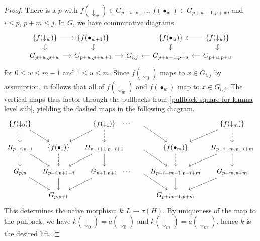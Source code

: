 \documentclass{amsart}
\numberwithin{theorem}{subsection}
\theoremstyle{definition}
\begin{document}
\begin{proof}
There is a $p$ with $f(\downarrow_w) \in G_{p+w, p+w}$, $f(\bullet_w) \in G_{p+w-1, p+w}$, 
and $i\leq p$, $p+m \leq j$.
In $G$, we have commutative diagrams
\[ \begin{tikzcd}[sep=small]
\{ f(\downarrow_w) \}  \rar \dar[hook] & \{ f(\bullet_{w+1}) \} \dar[hook] & & \{f(\bullet_u)\} \dar[hook] & \{f(\downarrow_u)\} \dar[hook] \lar \\
G_{p+w, p+w} \rar & G_{p+w,p+w+1} \rar & G_{i,j} & G_{p+u-1,p+u} \lar & G_{p+u,p+u} \lar
\end{tikzcd} \]
for $0\leq w \leq m-1$ and $1\leq u \leq m$. 
Since $f(\downarrow_0)$ maps to $x\in G_{i,j}$ by assumption, it follows that all of $f(\downarrow_w)$ and $f(\bullet_w)$ map to $x\in G_{i,j}$.
The vertical maps thus factor through the pullbacks from \eqref{pullback square for lemma level sub}, yielding the dashed maps in the following diagram.
\[
\begin{tikzcd}[column sep=tiny]
\{f(\downarrow_0)\} \arrow[dr] \dar[dashed] & & \{f(\downarrow_1)\} \arrow[dl]\dar[dashed] 
&[-1.6em] \cdots & {} \arrow[dr] & & \{f(\downarrow_m)\} \arrow[dl]\dar[dashed] 
 \\
H_{p-i,p-i} \arrow[dr]  \dar &  \{ f(\bullet_1) \}\dar[dashed]  & H_{p-i+1,p-i+1} \arrow[dl] \dar 
 & & {} \arrow[dr] & \{f(\bullet_m)\} \dar[dashed] & H_{p-i+m,p-i+m} \dar \arrow[dl] 
 \\
G_{p,p} \arrow[dr] & H_{p-i,p+1-i} \dar & G_{p+1,p+1} \arrow[dl]
&  \cdots & {}  \arrow[dr] & H_{p-i+m-1,p-i+m} \dar & G_{p+m,p+m} \arrow[dl]
 \\
& G_{p,p+1} & &  & & G_{p+m-1,p+m}
\end{tikzcd}
\]
This determines the na\"ive morphism $k \colon L \to \tau(H)$. 
By uniqueness of the map to the pullback, we have $k(\downarrow_0) = a(\downarrow_0)$ and $k(\downarrow_m) = a(\downarrow_m)$, hence $k$ is the desired lift.
\end{proof}
\end{document}
